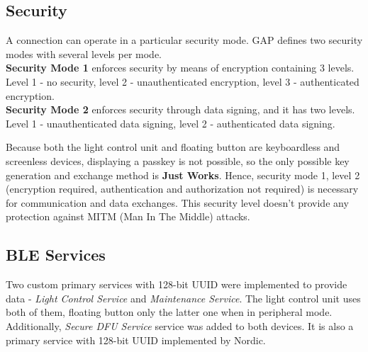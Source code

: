     \subsection{Security}
        \label{sec:app_ble_security}
        A connection can operate in a particular security mode. GAP defines two security modes with several levels per mode.\\
        \textbf{Security Mode 1} enforces security by means of encryption containing 3 levels. Level 1 - no security, level 2 - unauthenticated encryption, level 3 - authenticated encryption.\\
        \textbf{Security Mode 2} enforces security through data signing, and it has two levels. Level 1 - unauthenticated data signing, level 2 - authenticated data signing. \cite[45--47]{ble_book}
            
        Because both the light control unit and floating button are keyboardless and screenless devices, displaying a passkey is not possible, so the only possible key generation and exchange method is \textbf{Just Works}. Hence, security mode 1, level 2 (encryption required, authentication and authorization not required) is necessary for communication and data exchanges. This security level doesn't provide any protection against MITM (Man In The Middle) attacks.
    
    \subsection{BLE Services}
        \label{sec:app_ble_services}
        Two custom primary services with 128-bit UUID were implemented to provide data - \textit{Light Control Service} and \textit{Maintenance Service}. The light control unit uses both of them, floating button only the latter one when in peripheral mode.\\
        Additionally, \textit{Secure DFU Service} service was added to both devices. It is also a primary service with 128-bit UUID implemented by Nordic. 
        
